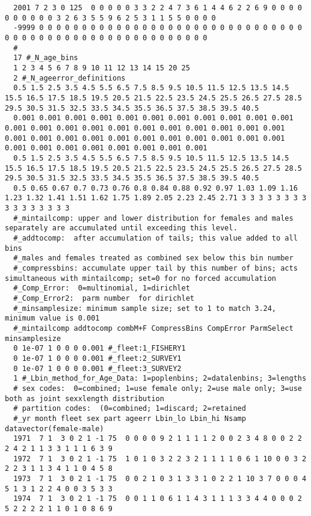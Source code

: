 \begin{landscape}
{\begin{verbatim}
  2001 7 2 3 0 125  0 0 0 0 0 3 3 2 2 4 7 3 6 1 4 4 6 2 2 6 9 0 0 0 0 0 0 0 0 0 0 3 2 6 3 5 5 9 6 2 5 3 1 1 5 5 0 0 0 0
  -9999 0 0 0 0 0 0 0 0 0 0 0 0 0 0 0 0 0 0 0 0 0 0 0 0 0 0 0 0 0 0 0 0 0 0 0 0 0 0 0 0 0 0 0 0 0 0 0 0 0 0 0 0 0 0 0 
  #
  17 #_N_age_bins
  1 2 3 4 5 6 7 8 9 10 11 12 13 14 15 20 25
  2 #_N_ageerror_definitions
  0.5 1.5 2.5 3.5 4.5 5.5 6.5 7.5 8.5 9.5 10.5 11.5 12.5 13.5 14.5 15.5 16.5 17.5 18.5 19.5 20.5 21.5 22.5 23.5 24.5 25.5 26.5 27.5 28.5 29.5 30.5 31.5 32.5 33.5 34.5 35.5 36.5 37.5 38.5 39.5 40.5
  0.001 0.001 0.001 0.001 0.001 0.001 0.001 0.001 0.001 0.001 0.001 0.001 0.001 0.001 0.001 0.001 0.001 0.001 0.001 0.001 0.001 0.001 0.001 0.001 0.001 0.001 0.001 0.001 0.001 0.001 0.001 0.001 0.001 0.001 0.001 0.001 0.001 0.001 0.001 0.001 0.001
  0.5 1.5 2.5 3.5 4.5 5.5 6.5 7.5 8.5 9.5 10.5 11.5 12.5 13.5 14.5 15.5 16.5 17.5 18.5 19.5 20.5 21.5 22.5 23.5 24.5 25.5 26.5 27.5 28.5 29.5 30.5 31.5 32.5 33.5 34.5 35.5 36.5 37.5 38.5 39.5 40.5
  0.5 0.65 0.67 0.7 0.73 0.76 0.8 0.84 0.88 0.92 0.97 1.03 1.09 1.16 1.23 1.32 1.41 1.51 1.62 1.75 1.89 2.05 2.23 2.45 2.71 3 3 3 3 3 3 3 3 3 3 3 3 3 3 3 3
  #_mintailcomp: upper and lower distribution for females and males separately are accumulated until exceeding this level.
  #_addtocomp:  after accumulation of tails; this value added to all bins
  #_males and females treated as combined sex below this bin number 
  #_compressbins: accumulate upper tail by this number of bins; acts simultaneous with mintailcomp; set=0 for no forced accumulation
  #_Comp_Error:  0=multinomial, 1=dirichlet
  #_Comp_Error2:  parm number  for dirichlet
  #_minsamplesize: minimum sample size; set to 1 to match 3.24, minimum value is 0.001
  #_mintailcomp addtocomp combM+F CompressBins CompError ParmSelect minsamplesize
  0 1e-07 1 0 0 0 0.001 #_fleet:1_FISHERY1
  0 1e-07 1 0 0 0 0.001 #_fleet:2_SURVEY1
  0 1e-07 1 0 0 0 0.001 #_fleet:3_SURVEY2
  1 #_Lbin_method_for_Age_Data: 1=poplenbins; 2=datalenbins; 3=lengths
  # sex codes:  0=combined; 1=use female only; 2=use male only; 3=use both as joint sexxlength distribution
  # partition codes:  (0=combined; 1=discard; 2=retained
  #_yr month fleet sex part ageerr Lbin_lo Lbin_hi Nsamp datavector(female-male)
  1971  7 1  3 0 2 1 -1 75  0 0 0 0 9 2 1 1 1 1 2 0 0 2 3 4 8 0 0 2 2 2 4 2 1 1 3 3 1 1 1 6 3 9
  1972  7 1  3 0 2 1 -1 75  1 0 1 0 3 2 2 3 2 1 1 1 1 0 6 1 10 0 0 3 2 2 2 3 1 1 3 4 1 1 0 4 5 8
  1973  7 1  3 0 2 1 -1 75  0 0 2 1 0 3 1 3 3 1 0 2 2 1 10 3 7 0 0 0 4 5 1 3 1 2 2 4 0 0 3 5 3 3
  1974  7 1  3 0 2 1 -1 75  0 0 1 1 0 6 1 1 4 3 1 1 1 3 3 4 4 0 0 0 2 5 2 2 2 2 1 1 0 1 0 8 6 9

\end{verbatim}}
\end{landscape}
